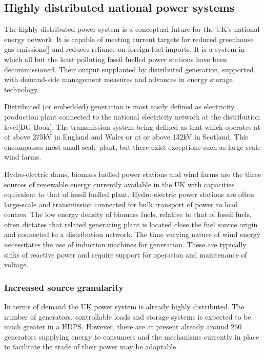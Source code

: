 \subsection{Highly distributed national power systems}
The highly distributed power system is a conceptual future for the UK's
national energy network.  It is capable of meeting current targets for reduced
greenhouse gas emissions[] and reduces reliance on foreign fuel imports.  It
is a system in which all but the least polluting fossil fuelled power stations
have been decommissioned.  Their output supplanted by distributed generation,
supported with demand-side management measures and advances in energy storage
technology.

Distributed (or embedded) generation is most easily defined as electricity
production plant connected to the national electricity network at the
distribution level[DG Book].  The transmission system being defined as that
which operates at of above 275kV in England and Wales or at or above 132kV in
Scotland.  This encompasses most small-scale plant, but there exist exceptions
such as large-scale wind farms.

Hydro-electric dams, biomass fuelled power stations and wind farms are the
three sources of renewable energy currently available in the UK with
capacities equivalent to that of fossil fuelled plant.  Hydro-electric power
stations are often large-scale and transmission connected for bulk transport
of power to load centres.  The low energy density of biomass fuels, relative
to that of fossil fuels, often dictates that related generating plant is
located close the fuel source origin and connected to a distribution network.
The time varying nature of wind energy necessitates the use of induction
machines for generation.  These are typically sinks of reactive power and
require support for operation and maintenance of voltage.

\subsubsection{Increased source granularity}
In terms of demand the UK power system is already highly distributed.  The
number of generators, controllable loads and storage systems is expected to be
much greater in a HDPS.  However, there are at present already around 260
generators supplying energy to consumers and the mechanisms currently in place
to facilitate the trade of their power may be adaptable.

